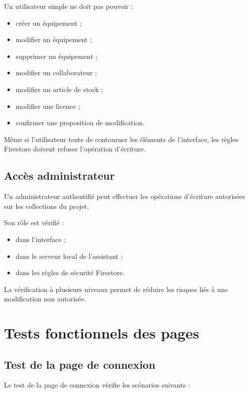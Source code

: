 \documentclass{rapportENSIAS}
\begin{document}
Un utilisateur simple ne doit pas pouvoir :

\begin{itemize}
    \item créer un équipement ;
    \item modifier un équipement ;
    \item supprimer un équipement ;
    \item modifier un collaborateur ;
    \item modifier un article de stock ;
    \item modifier une licence ;
    \item confirmer une proposition de modification.
\end{itemize}

Même si l’utilisateur tente de contourner les éléments de l’interface, les règles Firestore doivent refuser l’opération d’écriture.

\subsection{Accès administrateur}

Un administrateur authentifié peut effectuer les opérations d’écriture autorisées sur les collections du projet.

Son rôle est vérifié :

\begin{itemize}
    \item dans l’interface ;
    \item dans le serveur local de l’assistant ;
    \item dans les règles de sécurité Firestore.
\end{itemize}

La vérification à plusieurs niveaux permet de réduire les risques liés à une modification non autorisée.

\section{Tests fonctionnels des pages}

\subsection{Test de la page de connexion}

Le test de la page de connexion vérifie les scénarios suivants :
\end{document}

